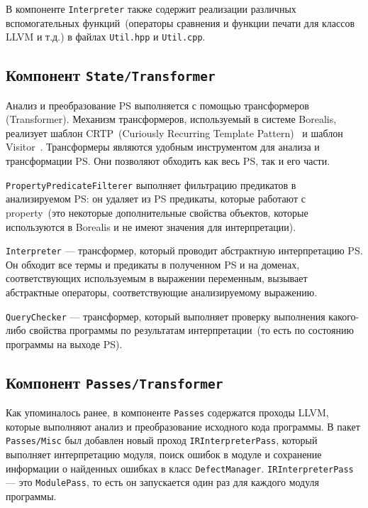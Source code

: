 В компоненте \texttt{Interpreter} также содержит реализации различных 
вспомогательных функций~(операторы сравнения и функции печати для классов LLVM
и т.д.) в файлах \texttt{Util.hpp} и \texttt{Util.cpp}.

\subsection{Компонент \texttt{State/Transformer}}
Анализ и преобразование PS выполняется с помощью трансформеров (Transformer). 
Механизм трансформеров, используемый в системе Borealis, реализует шаблон 
CRTP~(Curiously Recurring Template Pattern)~\cite{crtp} и шаблон 
Visitor~\cite{visitor}. Трансформеры являются удобным инструментом для анализа 
и трансформации PS. Они позволяют обходить как весь PS, так и его части.

\texttt{PropertyPredicateFilterer} выполняет фильтрацию предикатов в 
анализируемом PS: он удаляет из PS предикаты, которые работают с property~(это
некоторые дополнительные свойства объектов, которые используются в Borealis и
не имеют значения для интерпретации).

\texttt{Interpreter} --- трансформер, который проводит абстрактную интерпретацию
PS. Он обходит все термы и предикаты в полученном PS и на доменах,
соответствующих используемым в выражении переменным, вызывает абстрактные 
операторы, соответствующие анализируемому выражению.

\texttt{QueryChecker} --- трансформер, который выполняет проверку выполнения
какого-либо свойства программы по результатам интерпретации~(то есть по 
состоянию программы на выходе PS).

\subsection{Компонент \texttt{Passes/Transformer}}
Как упоминалось ранее, в компоненте \texttt{Passes} содержатся проходы LLVM,
которые выполняют анализ и преобразование исходного кода программы. В пакет
\texttt{Passes/Misc} был добавлен новый проход
\texttt{IRInterpreterPass}, который выполняет интерпретацию модуля, поиск 
ошибок в модуле и сохранение информации о найденных ошибках в класс 
\texttt{DefectManager}. \texttt{IRInterpreterPass} --- это \texttt{ModulePass}, 
то есть он запускается один раз для каждого модуля программы.

